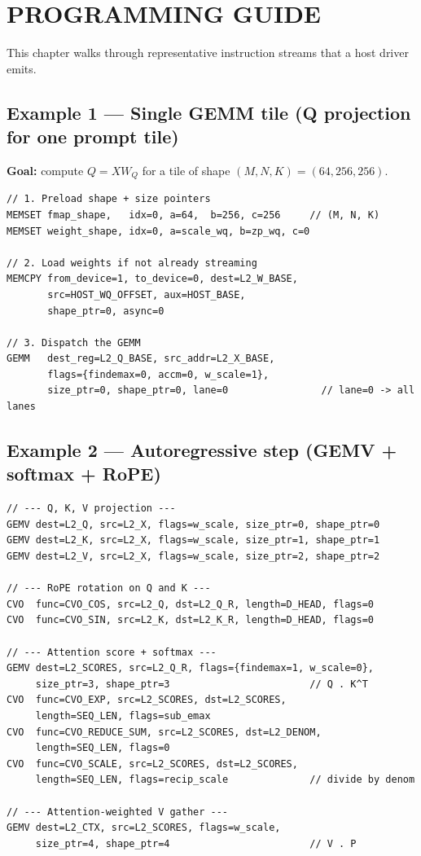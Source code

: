 \documentclass[11pt,a4paper,twoside,openany]{report}
\begin{document}
\newpage

\chapter{PROGRAMMING GUIDE}

This chapter walks through representative instruction streams that a
host driver emits.

\section{Example 1 --- Single GEMM tile (Q projection for one prompt tile)}

\textbf{Goal:} compute $Q = X W_Q$ for a tile of shape
$(M, N, K) = (64, 256, 256)$.

\begin{lstlisting}[style=sv]
// 1. Preload shape + size pointers
MEMSET fmap_shape,   idx=0, a=64,  b=256, c=256     // (M, N, K)
MEMSET weight_shape, idx=0, a=scale_wq, b=zp_wq, c=0

// 2. Load weights if not already streaming
MEMCPY from_device=1, to_device=0, dest=L2_W_BASE,
       src=HOST_WQ_OFFSET, aux=HOST_BASE,
       shape_ptr=0, async=0

// 3. Dispatch the GEMM
GEMM   dest_reg=L2_Q_BASE, src_addr=L2_X_BASE,
       flags={findemax=0, accm=0, w_scale=1},
       size_ptr=0, shape_ptr=0, lane=0                // lane=0 -> all lanes
\end{lstlisting}

\section{Example 2 --- Autoregressive step (GEMV + softmax + RoPE)}

\begin{lstlisting}[style=sv]
// --- Q, K, V projection ---
GEMV dest=L2_Q, src=L2_X, flags=w_scale, size_ptr=0, shape_ptr=0
GEMV dest=L2_K, src=L2_X, flags=w_scale, size_ptr=1, shape_ptr=1
GEMV dest=L2_V, src=L2_X, flags=w_scale, size_ptr=2, shape_ptr=2

// --- RoPE rotation on Q and K ---
CVO  func=CVO_COS, src=L2_Q, dst=L2_Q_R, length=D_HEAD, flags=0
CVO  func=CVO_SIN, src=L2_K, dst=L2_K_R, length=D_HEAD, flags=0

// --- Attention score + softmax ---
GEMV dest=L2_SCORES, src=L2_Q_R, flags={findemax=1, w_scale=0},
     size_ptr=3, shape_ptr=3                        // Q . K^T
CVO  func=CVO_EXP, src=L2_SCORES, dst=L2_SCORES,
     length=SEQ_LEN, flags=sub_emax
CVO  func=CVO_REDUCE_SUM, src=L2_SCORES, dst=L2_DENOM,
     length=SEQ_LEN, flags=0
CVO  func=CVO_SCALE, src=L2_SCORES, dst=L2_SCORES,
     length=SEQ_LEN, flags=recip_scale              // divide by denom

// --- Attention-weighted V gather ---
GEMV dest=L2_CTX, src=L2_SCORES, flags=w_scale,
     size_ptr=4, shape_ptr=4                        // V . P
\end{lstlisting}
\end{document}
